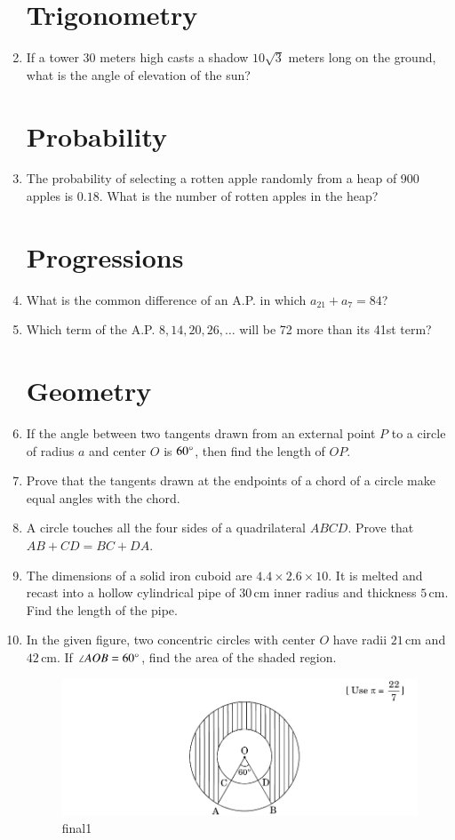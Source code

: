 \documentclass[12pt, letterpaper]{article}
\begin{document}
\begin{enumerate}
    \section*{Trigonometry}
    \item If a tower $30$ meters high casts a shadow $10\sqrt{3}$ meters long on the ground, what is the angle of elevation of the sun?

    \section*{Probability}
    \item The probability of selecting a rotten apple randomly from a heap of 900 apples is $0.18$. What is the number of rotten apples in the heap?

    \section*{Progressions}
    \item What is the common difference of an A.P. in which $a_{21} + a_{7} = 84$?
    \item Which term of the A.P. $8, 14, 20, 26, \ldots$ will be 72 more than its 41st term?

    \section*{Geometry}
    \item If the angle between two tangents drawn from an external point $P$ to a circle of radius $a$ and center $O$ is $60\degree$, then find the length of $OP$.
    \item Prove that the tangents drawn at the endpoints of a chord of a circle make equal angles with the chord.
    \item A circle touches all the four sides of a quadrilateral $ABCD$. Prove that $AB + CD = BC + DA$.
    \item The dimensions of a solid iron cuboid are $4.4 \times 2.6 \times 10$. It is melted and recast into a hollow cylindrical pipe of $30\,\mathrm{cm}$ inner radius and thickness $5\,\mathrm{cm}$. Find the length of the pipe.
    \item In the given figure, two concentric circles with center $O$ have radii $21\,\mathrm{cm}$ and $42\,\mathrm{cm}$. If $\angle AOB = 60\degree$, find the area of the shaded region.

    \begin{figure}[H]
        \centering
        \includegraphics[width=\columnwidth]{final1.jpg}
	    \caption{final1}
    \end{figure}


\end{enumerate}
\end{document}
